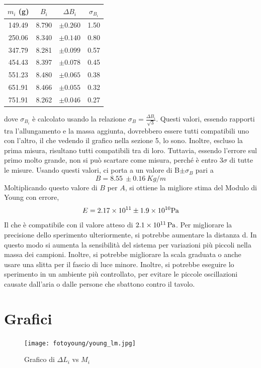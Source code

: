 \documentclass[a4paper]{article}
\begin{document}
\begin{table} [!ht]
    \centering
    \begin{tabular}{|c|c|c|c|}
    \hline
    $m_i$ (g) & $B_i$ & $\Delta B_i$ & $\sigma_{B_{i}}$ \\
    \hline
    149.49 & 8.790 & $\pm{0.260}$ & 1.50 \\
    250.06 & 8.340 & $\pm{0.140}$ & 0.80 \\
    347.79 & 8.281 & $\pm{0.099}$ & 0.57 \\
    454.43 & 8.397 & $\pm{0.078}$ & 0.45 \\
    551.23 & 8.480 & $\pm{0.065}$ & 0.38 \\
    651.91 & 8.466 & $\pm{0.055}$ & 0.32 \\
    751.91 & 8.262 & $\pm{0.046}$ & 0.27 \\
    \hline
    \end{tabular}
\end{table}
\FloatBarrier
dove $\sigma_{B_{i}}$ è calcolato usando la relazione $\sigma_B = \frac{\Delta B_i}{\sqrt{3}}$. Questi valori, essendo rapporti tra l'allungamento e la massa aggiunta, dovrebbero essere tutti compatibili uno con l'altro, il che vedendo il grafico nella sezione 5, lo sono. Inoltre, escluso la prima misura, risultano tutti compatibili tra di loro. Tuttavia, essendo l'errore sul primo molto grande, non si può scartare come misura, perché è entro 3$\sigma$ di tutte le misure. Usando questi valori, ci porta a un valore di B$\pm{\sigma_B}$ pari a 
\begin{equation}
    B = \SI{8.55}{} \pm{0.16} \SI{}{Kg/m}
\end{equation}
Moltiplicando questo valore di $B$ per $A$, si ottiene la migliore stima del Modulo di Young con errore, 
\begin{equation}
    E = \SI{2.17E11}{} \pm{\SI{1.9E10}{}} \SI{}{Pa}
\end{equation}
Il che è compatibile con il valore atteso di $\SI{2.1E11}{Pa}$. Per migliorare la precisione dello sperimento ulteriormente, si potrebbe aumentare la distanza d. In questo modo si aumenta la sensibilità del sistema per variazioni più piccoli nella massa dei campioni. Inoltre, si potrebbe migliorare la scala graduata o anche usare una slitta per il fascio di luce minore. Inoltre, si potrebbe eseguire lo sperimento in un ambiente più controllato, per evitare le piccole oscillazioni causate dall'aria o dalle persone che sbattono contro il tavolo. 

\newpage
\section{Grafici}
\begin{figure}[!h]
    \centering
    \texttt{[image: fotoyoung/young\_lm.jpg]}
    \caption{Grafico di $\Delta L_i$ vs $M_i$}
\end{figure}
\end{document}
